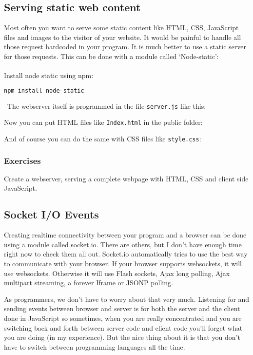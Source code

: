 \documentclass[a4paper]{report}
\begin{document}
\subsection*{Serving static web content}
Most often you want to serve some static content like HTML, CSS, JavaScript files and images to the visitor of your website. It would be painful to handle all those request hardcoded in your program. It is much better to use a static server for those requests. This can be done with a module called `Node-static':\\
\\
\noindent Install node static using npm:
\begin{lstlisting}[language=bash]
npm install node-static
\end{lstlisting}
\noindent\ The webserver itself is programmed in the file \texttt{server.js} like this:


\noindent Now you can put HTML files like \texttt{Index.html} in the public folder:


\noindent And of course you can do the same with CSS files like \texttt{style.css}:


\subsubsection*{Exercises}
Create a webserver, serving a complete webpage with HTML, CSS and client side JavaScript.

\subsection*{Socket I/O Events}
Creating realtime connectivity between your program and a browser can be done using a module called socket.io. There are others, but I don't have enough time right now to check them all out. Socket.io automatically tries to use the best way to communicate with your browser. If your browser supports websockets, it will use websockets. Otherwise it will use Flash sockets, Ajax long polling, Ajax multipart streaming, a forever Iframe or JSONP polling.

As programmers, we don't have to worry about that very much. Listening for and sending events between browser and server is for both the server and the client done in JavaScript so sometimes, when you are really concentrated and you are switching back and forth between server code and client code you'll forget what you are doing (in my experience). But the nice thing about it is that you don't have to switch between programming languages all the time.
\end{document}
